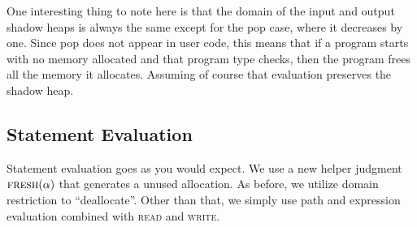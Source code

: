 One interesting thing to note here is that the domain of the input and output shadow heaps
is always the same except for the \textsf{pop} case, where it decreases by one.
Since \textsf{pop} does not appear in user code, this means that if a program starts
with no memory allocated and that program type checks, then the program frees all the
memory it allocates. Assuming of course that evaluation preserves the shadow heap.

\subsection*{Statement Evaluation}
Statement evaluation goes as you would expect.
We use a new helper judgment $\textsc{fresh}(\alpha)$ that generates a unused allocation.
As before, we utilize domain restriction to ``deallocate''.
Other than that, we simply use path and expression evaluation combined
with \textsc{read} and \textsc{write}.
\newline


